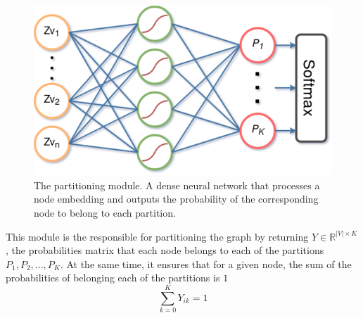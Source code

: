 \begin{figure}[h!]
    \label{fig:partitioning_module}
    \begin{center}
        \includegraphics[scale=0.5]{partitioning_module}
    \end{center}
    \caption{The partitioning module. A dense neural network that processes a node embedding and outputs the probability of the corresponding node to belong to each partition.}
\end{figure}
\newpage
This module is the responsible for partitioning the graph by returning $Y\in \mathbb R^{|V|\times K}$, the probabilities matrix that each node belongs to each of the partitions $P_1, P_2, ..., P_K$. At the same time, it ensures that for a given node, the sum of the probabilities of belonging each of the partitions is $1$
\begin{displaymath}
    \sum_{k=0}^K Y_{ik} = 1
\end{displaymath}


